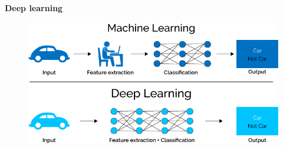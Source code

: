 \documentclass[xcolor=dvipsnames]{beamer}
\begin{document}
\begin{frame}{\bf Deep learning \footnotemark}

  \begin{figure}
    \includegraphics[scale=0.4]{../../pictures/end_to_end_learning.png}
  \end{figure}


\end{frame}
\end{document}
